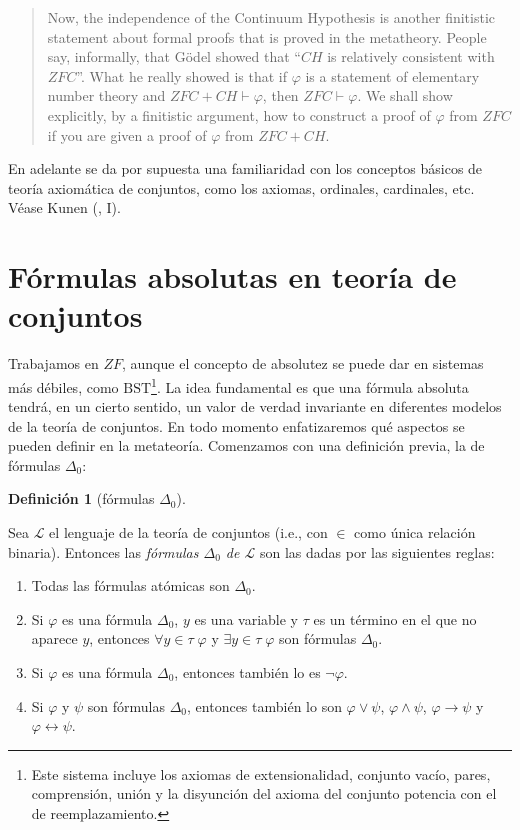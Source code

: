 \documentclass[11pt,a4paper]{book}
\theoremstyle{plain}
\theoremstyle{definition}
\newtheorem{definicion}[teorema]{Definición}
\theoremstyle{remark}
\begin{document}
\begin{quote}
\small
Now, the independence of the Continuum Hypothesis is another finitistic statement about formal proofs that is proved in the metatheory. People say, informally, that Gödel showed that ``$CH$ is relatively consistent with $ZFC$''. What he really showed is that if $\varphi$ is a statement of elementary number theory and $ZFC + CH \vdash \varphi$, then $ZFC \vdash \varphi$. We shall show explicitly, by a finitistic argument, how to construct a proof of $\varphi$ from $ZFC$ if you are given a proof of $\varphi$ from $ZFC + CH$.
\end{quote}

En adelante se da por supuesta una familiaridad con los conceptos básicos de teoría axiomática de conjuntos, como los axiomas, ordinales, cardinales, etc. Véase Kunen (\citeyear{Kunen2011}, I).

\section{Fórmulas absolutas en teoría de conjuntos}

Trabajamos en $ZF$, aunque el concepto de absolutez se puede dar en sistemas más débiles, como $\mathrm{BST}$\footnote{Este sistema incluye los axiomas de extensionalidad, conjunto vacío, pares, comprensión, unión y la disyunción del axioma del conjunto potencia con el de reemplazamiento.}. La idea fundamental es que una fórmula absoluta tendrá, en un cierto sentido, un valor de verdad invariante en diferentes modelos de la teoría de conjuntos. En todo momento enfatizaremos qué aspectos se pueden definir en la metateoría. Comenzamos con una definición previa, la de fórmulas $\Delta_0$:

\begin{definicion}[fórmulas $\Delta_0$]
  \label{def-delta-0}

  Sea $\mathcal{L}$ el lenguaje de la teoría de conjuntos (i.e., con $\in$ como única relación binaria). Entonces las \textit{fórmulas $\Delta_0$ de $\mathcal{L}$} son las dadas por las siguientes reglas:

  \begin{enumerate}
    \item Todas las fórmulas atómicas son $\Delta_0$.
    
    \item Si $\varphi$ es una fórmula $\Delta_0$, $y$ es una variable y $\tau$ es un término en el que no aparece $y$, entonces $\forall y \in \tau \; \varphi$ y $\exists y \in \tau \; \varphi$ son fórmulas $\Delta_0$.
    
    \item Si $\varphi$ es una fórmula $\Delta_0$, entonces también lo es $\neg \varphi$.

    \item Si $\varphi$ y $\psi$ son fórmulas $\Delta_0$, entonces también lo son 
    $\varphi \vee \psi$, $\varphi \wedge \psi$, $\varphi \rightarrow \psi$ y 
    $\varphi \leftrightarrow \psi$.

  \end{enumerate}
\end{definicion}
\end{document}
